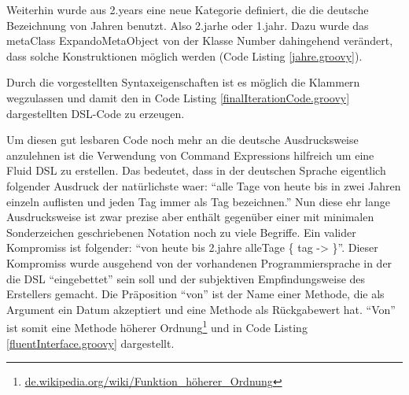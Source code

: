 \documentclass[11pt,english,ngerman, headsepline]{scrreprt}
\begin{document}
Weiterhin wurde aus 2.years eine neue Kategorie definiert, die die deutsche
Bezeichnung von Jahren benutzt. Also 2.jarhe oder 1.jahr.
Dazu wurde das metaClass ExpandoMetaObject von der Klasse Number
dahingehend verändert, dass solche Konstruktionen möglich werden (Code Listing
 \ref{jahre.groovy}).



Durch die vorgestellten Syntaxeigenschaften ist es möglich die Klammern
wegzulassen und damit den in Code Listing \ref{finalIterationCode.groovy}
dargestellten DSL-Code zu erzeugen.



Um diesen gut lesbaren Code noch mehr an die deutsche Ausdrucksweise anzulehnen
ist die Verwendung von Command Expressions hilfreich um eine Fluid DSL zu
erstellen. Das bedeutet, dass in der deutschen Sprache eigentlich folgender
Ausdruck der natürlichste waer: ``alle Tage von heute bis in zwei Jahren
einzeln auflisten und jeden Tag immer als Tag bezeichnen.'' Nun diese ehr lange
Ausdrucksweise ist zwar prezise aber enthält gegenüber einer mit
minimalen Sonderzeichen geschriebenen Notation noch zu viele Begriffe.
Ein valider Kompromiss ist folgender: ``von heute bis 2.jahre alleTage \{ tag
-> \}''.
Dieser Kompromiss wurde ausgehend von der vorhandenen Programmiersprache in der
die DSL ``eingebettet'' sein soll und der subjektiven Empfindungsweise des
Erstellers gemacht. 
Die Präposition ``von'' ist der Name einer Methode, die als Argument ein Datum
akzeptiert und eine Methode als Rückgabewert hat.
``Von'' ist somit eine Methode höherer
Ordnung\footnote{ \url{de.wikipedia.org/wiki/Funktion_höherer_Ordnung} } und
in Code Listing \ref{fluentInterface.groovy} dargestellt.


 
\end{document}
